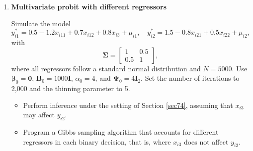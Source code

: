 \begin{enumerate}
	\item \textbf{Multivariate probit with different regressors}
	
	Simulate the model
	\[
	y_{i1}^* = 0.5 - 1.2x_{i11} + 0.7x_{i12} + 0.8x_{i3} + \mu_{i1}, \quad
	y_{i2}^* = 1.5 - 0.8x_{i21} + 0.5x_{i22} + \mu_{i2},
	\]
	with
	\[
	\bm{\Sigma} =
	\begin{bmatrix}
		1 & 0.5 \\
		0.5 & 1
	\end{bmatrix},
	\]
	where all regressors follow a standard normal distribution and $N = 5000$. Use $\bm{\beta}_0 = \bm{0}$, $\bm{B}_0 = 1000\bm{I}$, $\alpha_0 = 4$, and $\bm{\Psi}_0 = 4\bm{I}_2$. Set the number of iterations to 2,000 and the thinning parameter to 5.
	
	\begin{itemize}
		\item Perform inference under the setting of Section \ref{sec74}, assuming that $x_{i3}$ may affect $y_{i2}$.
		\item Program a Gibbs sampling algorithm that accounts for different regressors in each binary decision, that is, where $x_{i3}$ does not affect $y_{i2}$.
	\end{itemize}
	
\end{enumerate}



